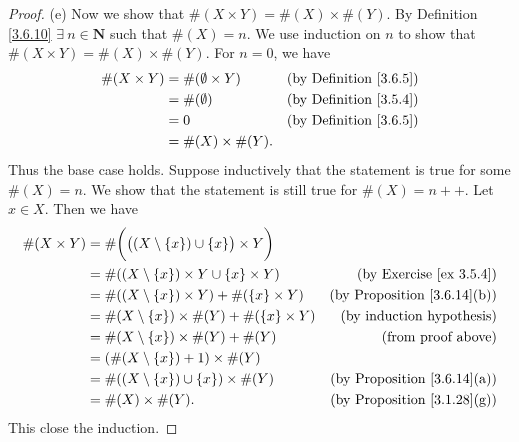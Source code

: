 \begin{proof}{(e)}
    Now we show that \(\#(X \times Y) = \#(X) \times \#(Y)\).
    By Definition \ref{3.6.10} \(\exists\ n \in \mathbf{N}\) such that \(\#(X) = n\).
    We use induction on \(n\) to show that \(\#(X \times Y) = \#(X) \times \#(Y)\).
    For \(n = 0\), we have
    \begin{align*}
        \#(X \times Y) & = \#(\emptyset \times Y) & \text{(by Definition \ref{3.6.5})} \\
                       & = \#(\emptyset)          & \text{(by Definition \ref{3.5.4})} \\
                       & = 0                      & \text{(by Definition \ref{3.6.5})} \\
                       & = \#(X) \times \#(Y).
    \end{align*}
    Thus the base case holds.
    Suppose inductively that the statement is true for some \(\#(X) = n\).
    We show that the statement is still true for \(\#(X) = n++\).
    Let \(x \in X\).
    Then we have
    \begin{align*}
        \#(X \times Y) & = \#\bigg(\big((X \setminus \{x\}) \cup \{x\}\big) \times Y\bigg)                                           \\
                       & = \#((X \setminus \{x\}) \times Y \cup \{x\} \times Y)            & \text{(by Exercise \ref{ex 3.5.4})}     \\
                       & = \#((X \setminus \{x\}) \times Y) + \#(\{x\} \times Y)           & \text{(by Proposition \ref{3.6.14}(b))} \\
                       & = \#(X \setminus \{x\}) \times \#(Y) + \#(\{x\} \times Y)         & \text{(by induction hypothesis)}        \\
                       & = \#(X \setminus \{x\}) \times \#(Y) + \#(Y)                      & \text{(from proof above)}               \\
                       & = (\#(X \setminus \{x\}) + 1) \times \#(Y)                                                                  \\
                       & = \#((X \setminus \{x\}) \cup \{x\}) \times \#(Y)                 & \text{(by Proposition \ref{3.6.14}(a))} \\
                       & = \#(X) \times \#(Y).                                             & \text{(by Proposition \ref{3.1.28}(g))}
    \end{align*}
    This close the induction.
\end{proof}

